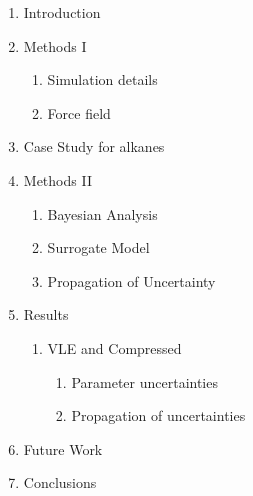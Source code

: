 \documentclass[preprint,letterpaper,floatfix,citeautoscript,aip,jcp]{revtex4-1}
\begin{document}
%
%
%
%

\begin{enumerate}
	\item Introduction
	\item Methods I
	\begin{enumerate}
		\item Simulation details
		\item Force field
	\end{enumerate}
	\item Case Study for alkanes
	\item Methods II
	\begin{enumerate}
		\item Bayesian Analysis
		\item Surrogate Model
		\item Propagation of Uncertainty
	\end{enumerate}
	\item Results
	\begin{enumerate}
		\item VLE and Compressed
		\begin{enumerate}
			\item Parameter uncertainties
			\item Propagation of uncertainties
		\end{enumerate}
	\end{enumerate}
	\item Future Work
	\item Conclusions	
\end{enumerate}
\end{document}
